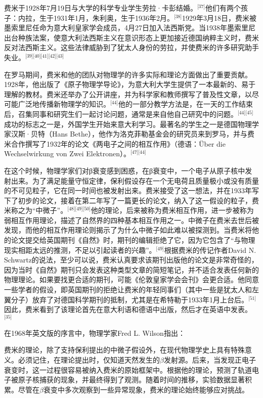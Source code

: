 费米于1928年7月19日与大学的科学专业学生劳拉·卡彭结婚。\(^\text{[37]}\)他们有两个孩子：内拉，生于1931年1月，朱利奥，生于1936年2月。\(^\text{[38]}\)1929年3月18日，费米被墨索里尼任命为意大利皇家学会成员，4月27日加入法西斯党。当1938年墨索里尼出台种族法案，使意大利法西斯主义在意识形态上更加接近德国纳粹主义时，费米反对法西斯主义。这些法律威胁到了犹太人身份的劳拉，并使费米的许多研究助手失业。\(^\text{[39][40][41][42][43]}\)

在罗马期间，费米和他的团队对物理学的许多实际和理论方面做出了重要贡献。1928年，他出版了《原子物理学导论》，为意大利大学生提供了一本最新的、易于理解的教材。费米还举办了公开讲座，并为科学家和教师撰写了普及性文章，以尽可能广泛地传播新物理学的知识。\(^\text{[44]}\)他的一部分教学方法是，在一天的工作结束后，召集同事和研究生们一起讨论问题，通常是来自他自己研究中的问题。\(^\text{[44][45]}\)成功的标志之一是，外国学生开始来意大利学习。最著名的学生之一是德国物理学家汉斯·贝特（Hans Bethe），他作为洛克菲勒基金会的研究员来到罗马，并与费米合作撰写了1932年的论文《两电子之间的相互作用》（德语：Über die Wechselwirkung von Zwei Elektronen）。\(^\text{[47][44]}\)

在这个时候，物理学家们对β衰变感到困惑，在β衰变中，一个电子从原子核中发射出来。为了满足能量守恒定律，保利假设存在一个无电荷且质量极小或没有质量的不可见粒子，它在同一时间也被发射出来。费米接受了这一想法，并在1933年写下了初步的论文，接着在第二年写了一篇更长的论文，纳入了这一假设的粒子，费米称之为“中微子”。\(^\text{[48][49][50]}\)他的理论，后来被称为费米相互作用，进一步被称为弱相互作用理论，描述了自然界的四种基本相互作用之一。中微子在费米去世后被发现，而他的相互作用理论则揭示了为什么中微子如此难以被探测到。当费米将他的论文提交给英国期刊《自然》时，期刊的编辑拒绝了它，因为它包含了“与物理现实相距太远的推测，不足以引起读者的兴趣”。\(^\text{[49]}\)根据费米的传记作者David N. Schwartz的说法，至少可以说，费米认真要求该期刊出版他的论文是非常奇怪的，因为当时《自然》期刊只会发表这种类型文章的简短笔记，并不适合发表任何新的物理理论。如果要找更合适的期刊，可能《伦敦皇家学会会刊》会更合适。他同意一些学者的假设，即英国期刊的拒绝让费米的年轻同事们（其中一些是犹太人和左翼分子）放弃了对德国科学期刊的抵制，尤其是在希特勒于1933年1月上台后。\(^\text{[51]}\)因此，费米看到了该理论首先在意大利语和德语中出版，然后才在英语中发表。\(^\text{[35]}\)

在1968年英文版的序言中，物理学家Fred L. Wilson指出：

费米的理论，除了支持保利提出的中微子假设外，在现代物理学史上具有特殊意义。必须记住，在理论提出时，仅知道天然发生的$\beta$发射源。后来，当发现正电子衰变时，这一过程很容易被纳入费米的原始框架中。根据他的理论，预测了轨道电子被原子核捕获的现象，并最终得到了观测。随着时间的推移，实验数据显著积累。尽管在$\beta$衰变中多次观察到一些异常现象，费米的理论始终能够应对挑战。

